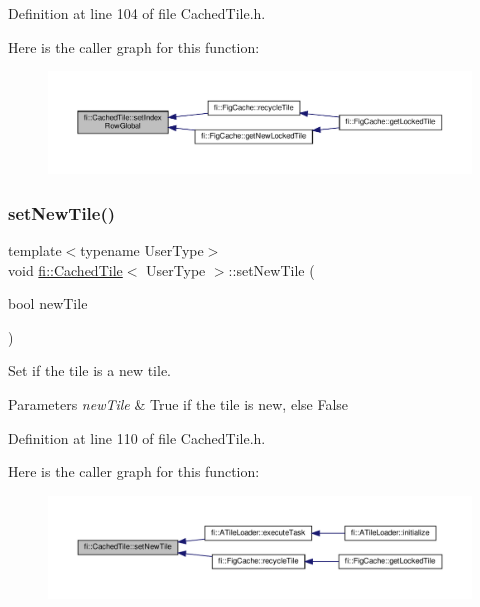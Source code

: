 Definition at line 104 of file Cached\+Tile.\+h.

Here is the caller graph for this function\+:
\nopagebreak
\begin{figure}[H]
\begin{center}
\leavevmode
\includegraphics[width=350pt]{d0/dbc/classfi_1_1CachedTile_a18d2ea689e777d9d341fa09564edc752_icgraph}
\end{center}
\end{figure}
\mbox{\label{classfi_1_1CachedTile_afc0c6c1365b9a4205c221f1d061c3611}} 
\subsubsection{\texorpdfstring{set\+New\+Tile()}{setNewTile()}}
{\footnotesize\ttfamily template$<$typename User\+Type$>$ \\
void \hyperlink{classfi_1_1CachedTile}{fi\+::\+Cached\+Tile}$<$ User\+Type $>$\+::set\+New\+Tile (\begin{DoxyParamCaption}\item[{bool}]{new\+Tile }\end{DoxyParamCaption})\hspace{0.3cm}{\ttfamily [inline]}}



Set if the tile is a new tile. 


\begin{DoxyParams}{Parameters}
{\em new\+Tile} & True if the tile is new, else False \\
\hline
\end{DoxyParams}


Definition at line 110 of file Cached\+Tile.\+h.

Here is the caller graph for this function\+:
\nopagebreak
\begin{figure}[H]
\begin{center}
\leavevmode
\includegraphics[width=350pt]{d0/dbc/classfi_1_1CachedTile_afc0c6c1365b9a4205c221f1d061c3611_icgraph}
\end{center}
\end{figure}
\mbox{\label{classfi_1_1CachedTile_a2ea14c7fc1599f72a5d725ae7983457d}} 

